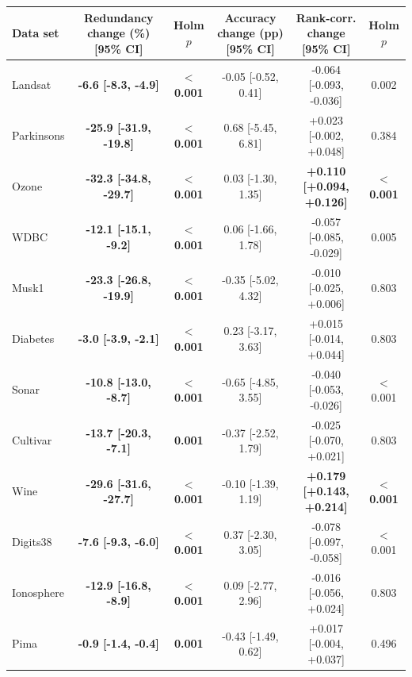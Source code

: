 \begin{tabular}{lccccc}
\toprule
Data set & Redundancy change (\%) [95\% CI] & Holm $p$ & Accuracy change (pp) [95\% CI] & Rank-corr. change [95\% CI] & Holm $p$ \\
\midrule
Landsat & \textbf{-6.6 [-8.3, -4.9]} & \textbf{$<$0.001} & -0.05 [-0.52, 0.41] & -0.064 [-0.093, -0.036] & 0.002 \\
Parkinsons & \textbf{-25.9 [-31.9, -19.8]} & \textbf{$<$0.001} & 0.68 [-5.45, 6.81] & +0.023 [-0.002, +0.048] & 0.384 \\
Ozone & \textbf{-32.3 [-34.8, -29.7]} & \textbf{$<$0.001} & 0.03 [-1.30, 1.35] & \textbf{+0.110 [+0.094, +0.126]} & \textbf{$<$0.001} \\
WDBC & \textbf{-12.1 [-15.1, -9.2]} & \textbf{$<$0.001} & 0.06 [-1.66, 1.78] & -0.057 [-0.085, -0.029] & 0.005 \\
Musk1 & \textbf{-23.3 [-26.8, -19.9]} & \textbf{$<$0.001} & -0.35 [-5.02, 4.32] & -0.010 [-0.025, +0.006] & 0.803 \\
Diabetes & \textbf{-3.0 [-3.9, -2.1]} & \textbf{$<$0.001} & 0.23 [-3.17, 3.63] & +0.015 [-0.014, +0.044] & 0.803 \\
Sonar & \textbf{-10.8 [-13.0, -8.7]} & \textbf{$<$0.001} & -0.65 [-4.85, 3.55] & -0.040 [-0.053, -0.026] & $<$0.001 \\
Cultivar & \textbf{-13.7 [-20.3, -7.1]} & \textbf{0.001} & -0.37 [-2.52, 1.79] & -0.025 [-0.070, +0.021] & 0.803 \\
Wine & \textbf{-29.6 [-31.6, -27.7]} & \textbf{$<$0.001} & -0.10 [-1.39, 1.19] & \textbf{+0.179 [+0.143, +0.214]} & \textbf{$<$0.001} \\
Digits38 & \textbf{-7.6 [-9.3, -6.0]} & \textbf{$<$0.001} & 0.37 [-2.30, 3.05] & -0.078 [-0.097, -0.058] & $<$0.001 \\
Ionosphere & \textbf{-12.9 [-16.8, -8.9]} & \textbf{$<$0.001} & 0.09 [-2.77, 2.96] & -0.016 [-0.056, +0.024] & 0.803 \\
Pima & \textbf{-0.9 [-1.4, -0.4]} & \textbf{0.001} & -0.43 [-1.49, 0.62] & +0.017 [-0.004, +0.037] & 0.496 \\
\bottomrule
\end{tabular}
